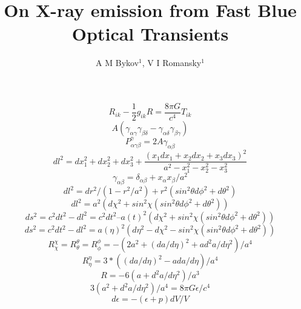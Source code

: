 \documentclass[a4paper,12pt]{extreport}
\begin{document}
	\title{On X-ray emission from Fast Blue Optical Transients}
	
	\author{A M Bykov$^{1}$, V I Romansky$^{1}$}
	
\begin{equation}
R_{ik}-\frac{1}{2} g_{ik}R=\frac{8\pi G}{c^4} T_{ik}
\end{equation}
\begin{equation}
A(\gamma_{\alpha\gamma}\gamma_{\beta\delta} - \gamma_{\alpha\delta}\gamma_{\beta\gamma})
\end{equation}
\begin{equation}
P^\gamma_{\alpha\gamma\beta}=2A\gamma_{\alpha\beta}
\end{equation}
\begin{equation}
dl^2 = dx_1^2+dx_2^2+dx_3^2+\frac{(x_1 dx_1 + x_2 dx_2 +x_3 dx_3)^2}{a^2-x_1^2-x_2^2-x_3^2}
\end{equation}
\begin{equation}
\gamma_{\alpha\beta}=\delta_{\alpha\beta}+x_\alpha x_\beta/a^2
\end{equation}
\begin{equation}
dl^2=dr^2/(1-r^2/a^2)+r^2(sin^2 \theta d\phi^2+d\theta^2)
\end{equation}
\begin{equation}
dl^2=a^2(d\chi^2 + sin^2\chi(sin^2 \theta d\phi^2+d\theta^2))
\end{equation}
\begin{equation}
ds^2 = c^2 dt^2-dl^2 = c^2 dt^2 – a(t)^2(d\chi^2 + sin^2\chi(sin^2 \theta d\phi^2+d\theta^2))
\end{equation}
\begin{equation}
ds^2 = c^2 dt^2-dl^2 = a(\eta)^2( d\eta^2 - d\chi^2 - sin^2\chi(sin^2 \theta d\phi^2+d\theta^2))
\end{equation}
\begin{equation}
R^\chi_\chi = R^\theta_\theta = R^\phi_\phi= -(2 a^2 + (da/d\eta)^2 + a d^2a/d\eta^2)/a^4
\end{equation}
\begin{equation}
R^\eta_\eta=3*((da/d\eta)^2-a da/d\eta)/a^4
\end{equation}
\begin{equation}
R=-6(a+d^2a/d\eta^2)/a^3
\end{equation}
\begin{equation}
3(a^2+d^2a/d\eta^2)/a^4 = 8 \pi G \epsilon/c^4
\end{equation}
\begin{equation}
d\epsilon=-(\epsilon + p)dV/V
\end{equation}
\end{document}
